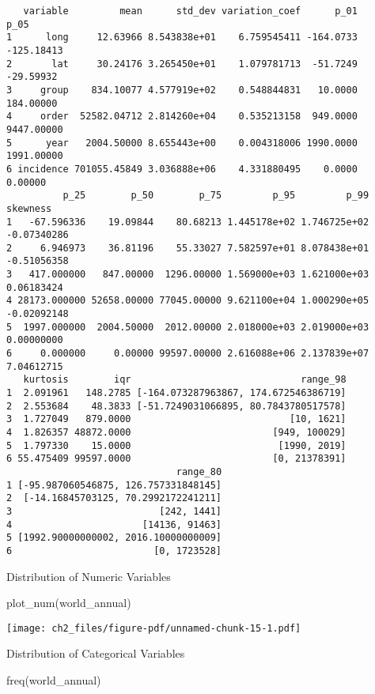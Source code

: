 \documentclass[
  letterpaper,
  DIV=11,
  numbers=noendperiod]{scrreprt}
\newenvironment{Shaded}{\begin{snugshade}}{\end{snugshade}}
\newcommand{\FunctionTok}[1]{\textcolor[rgb]{0.28,0.35,0.67}{#1}}
\newcommand{\NormalTok}[1]{\textcolor[rgb]{0.00,0.23,0.31}{#1}}
\begin{document}
\begin{verbatim}
   variable         mean      std_dev variation_coef      p_01       p_05
1      long     12.63966 8.543838e+01    6.759545411 -164.0733 -125.18413
2       lat     30.24176 3.265450e+01    1.079781713  -51.7249  -29.59932
3     group    834.10077 4.577919e+02    0.548844831   10.0000  184.00000
4     order  52582.04712 2.814260e+04    0.535213158  949.0000 9447.00000
5      year   2004.50000 8.655443e+00    0.004318006 1990.0000 1991.00000
6 incidence 701055.45849 3.036888e+06    4.331880495    0.0000    0.00000
          p_25        p_50        p_75         p_95         p_99    skewness
1   -67.596336    19.09844    80.68213 1.445178e+02 1.746725e+02 -0.07340286
2     6.946973    36.81196    55.33027 7.582597e+01 8.078438e+01 -0.51056358
3   417.000000   847.00000  1296.00000 1.569000e+03 1.621000e+03  0.06183424
4 28173.000000 52658.00000 77045.00000 9.621100e+04 1.000290e+05 -0.02092148
5  1997.000000  2004.50000  2012.00000 2.018000e+03 2.019000e+03  0.00000000
6     0.000000     0.00000 99597.00000 2.616088e+06 2.137839e+07  7.04612715
   kurtosis        iqr                              range_98
1  2.091961   148.2785 [-164.073287963867, 174.672546386719]
2  2.553684    48.3833 [-51.7249031066895, 80.7843780517578]
3  1.727049   879.0000                            [10, 1621]
4  1.826357 48872.0000                         [949, 100029]
5  1.797330    15.0000                          [1990, 2019]
6 55.475409 99597.0000                         [0, 21378391]
                              range_80
1 [-95.987060546875, 126.757331848145]
2  [-14.16845703125, 70.2992172241211]
3                          [242, 1441]
4                       [14136, 91463]
5 [1992.90000000002, 2016.10000000009]
6                         [0, 1723528]
\end{verbatim}

Distribution of Numeric Variables

\begin{Shaded}
\begin{Highlighting}[]
\FunctionTok{plot\_num}\NormalTok{(world\_annual)}
\end{Highlighting}
\end{Shaded}

\texttt{[image: ch2\_files/figure-pdf/unnamed-chunk-15-1.pdf]}

Distribution of Categorical Variables

\begin{Shaded}
\begin{Highlighting}[]
\FunctionTok{freq}\NormalTok{(world\_annual)}
\end{Highlighting}
\end{Shaded}
\end{document}
